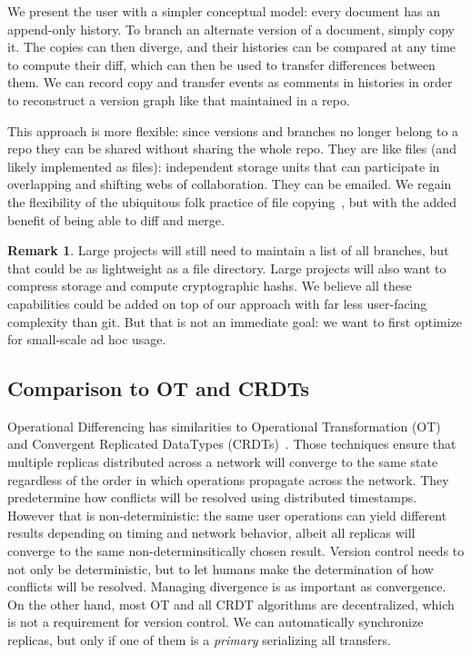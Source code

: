 \documentclass[english,submission]{programming}
\theoremstyle{definition}
\newtheorem*{remark}{Remark}
\begin{document}
We present the user with a simpler conceptual model: every document has an append-only history. To branch an alternate version of a document, simply copy it. The copies can then diverge, and their histories can be compared at any time to compute their diff, which can then be used to transfer differences between them. We can record copy and transfer events as comments in histories in order to reconstruct a version graph like that maintained in a repo.

This approach is more flexible: since versions and branches no longer belong to a repo they can be shared without sharing the whole repo. They are like files (and likely implemented as files): independent storage units that can participate in overlapping and shifting webs of collaboration. They can be emailed. We regain the flexibility of the ubiquitous folk practice of file copying~\cite{Burnett14, Basman19}, but with the added benefit of being able to diff and merge.

\begin{remark}
  Large projects will still need to maintain a list of all branches, but that could be as lightweight as a file directory. Large projects will also want to compress storage and compute cryptographic hashs. We believe all these capabilities could be added on top of our approach with far less user-facing complexity than git. But that is not an immediate goal: we want to first optimize for small-scale ad hoc usage.
\end{remark}

\subsection{Comparison to OT and CRDTs}

Operational Differencing has similarities to
Operational Transformation (OT)~\cite{Ellis89, Ressel96, Oster06} and Convergent Replicated DataTypes (CRDTs)~\cite{Shapiro11}.
Those techniques ensure that multiple replicas distributed across a network will converge to the same state regardless of the order in which operations propagate across the network. They predetermine how conflicts will be resolved using distributed timestamps. However that is non-deterministic: the same user operations can yield different results depending on timing and network behavior, albeit all replicas will converge to the same non-determinsitically chosen result. Version control needs to not only be deterministic, but to let humans make the determination of how conflicts will be resolved. Managing divergence is as important as convergence. On the other hand, most OT and all CRDT algorithms are decentralized, which is not a requirement for version control.
We can automatically synchronize replicas, but only if one of them is a \textit{primary} serializing all transfers.
\end{document}
